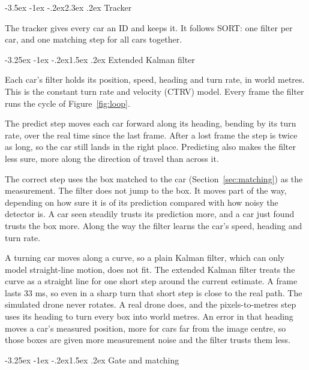 \documentclass[11pt]{article}
\makeatletter
\renewcommand\section{\@startsection{section}{1}{\z@}%
  {-3.5ex \@plus -1ex \@minus -.2ex}{2.3ex \@plus .2ex}%
  {\normalfont\Large\bfseries\color{accent}}}
\renewcommand\subsection{\@startsection{subsection}{2}{\z@}%
  {-3.25ex \@plus -1ex \@minus -.2ex}{1.5ex \@plus .2ex}%
  {\normalfont\large\bfseries\color{accent}}}
\makeatother
\begin{document}
\section{Tracker}
\label{sec:tracker}

The tracker gives every car an ID and keeps it. It follows SORT: one filter
per car, and one matching step for all cars together.

\subsection{Extended Kalman filter}

Each car's filter holds its position, speed, heading and turn rate, in world
metres. This is the constant turn rate and velocity (CTRV) model. Every
frame the filter runs the cycle of Figure~\ref{fig:loop}.

The predict step moves each car forward along its heading, bending by its
turn rate, over the real time since the last frame. After a lost frame the
step is twice as long, so the car still lands in the right place.
Predicting also makes the filter less sure, more along the direction of
travel than across it.

The correct step uses the box matched to the car
(Section~\ref{sec:matching}) as the measurement. The filter does not jump to
the box. It moves part of the way, depending on how sure it is of its
prediction compared with how noisy the detector is. A car seen steadily
trusts its prediction more, and a car just found trusts the box more. Along
the way the filter learns the car's speed, heading and turn rate.

A turning car moves along a curve, so a plain Kalman filter, which can only
model straight-line motion, does not fit. The extended Kalman filter treats
the curve as a straight line for one short step around the current
estimate. A frame lasts 33 ms, so even in a sharp turn that short step is
close to the real path. The simulated drone never rotates. A real drone
does, and the pixels-to-metres step uses its heading to turn every box into
world metres. An error in that heading moves a car's measured position,
more for cars far from the image centre, so those boxes are given more
measurement noise and the filter trusts them less.

\subsection{Gate and matching}
\label{sec:matching}
\end{document}
